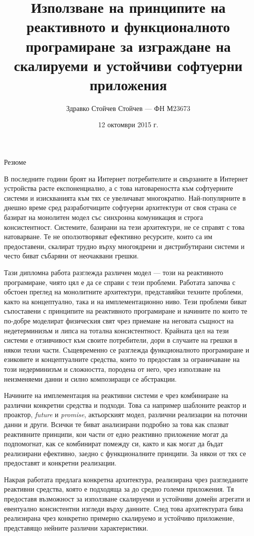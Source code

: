 \documentclass[a4paper, 12pt]{article}
\title{Използване на принципите на реактивното и функционалното програмиране за изграждане на скалируеми и устойчиви софтуерни приложения}
\author{Здравко Стойчев Стойчев — ФН М23673}
\date{12 октомври 2015 г.}
\begin{document}
  \maketitle
  
  \begin{center}
    \large Резюме
    \vspace{0.2em}
  \end{center}

  В последните години броят на Интернет потребителите и свързаните в Интернет устройства расте експоненциално, а с това натовареността към софтуерните системи и изискванията към тях се увеличават многократно. Най-популярните в днешно време сред разработчиците софтуерни архитектури от своя страна се базират на монолитен модел със синхронна комуникация и строга консистентност. Системите, базирани на тези архитектури, не се справят с това натоварване. Те не оползотворяват ефективно ресурсите, които са им предоставени, скалират трудно върху многоядрени и дистрибутирани системи и често биват събаряни от неочаквани грешки.
  
  Тази дипломна работа разглежда различен модел — този на реактивното програмиране, чиято цял е да се справи с тези проблеми. Работата започва с обстоен преглед на монолитните архитектури, представяйки техните проблеми, както на концептуално, така и на имплементационно ниво. Тези проблеми биват съпоставени с принципите на реактивното програмиране и начините по които те по-добре моделират физическия свят чрез приемане на неговата същност на недетерминизъм и липса на тотална консистентност. Крайната цел на тези системи е отзивчивост към своите потребители, дори в случаите на грешки в някои техни части. Същевременно се разглежда функционалното програмиране и езиковите и концептуалните средства, които то предоставя за ограничаване на този недерминизъм и сложността, породена от него, чрез използване на неизменяеми данни и силно композиращи се абстракции.
  
  Начините на имплементация на реактивни системи е чрез комбиниране на различни конкретни средства и подходи. Това са например шаблоните реактор и проактор, \textit{\textenglish{future}} и \textit{\textenglish{promise}}, актьорският модел, различни реализации на поточни данни и други. Всички те биват анализирани подробно за това как спазват реактивните принципи, кои части от едно реактивно приложение могат да подпомогнат, как се комбинират помежду си, както и как могат да бъдат реализирани ефективно, заедно с функционалните принципи. За някои от тях се предоставят и конкретни реализации.
  
  Накрая работата предлага конкретна архитектура, реализирана чрез разгледаните реактивни средства, която е подходяща за до средно големи приложения. Тя предоставя възможност за използване скалируеми и устойчиви домейн агрегати и евентуално консистентни изгледи върху данните. След това архитектурата бива реализирана чрез конкретно примерно скалируемо и устойчиво приложение, представящо нейните различни характеристики.
\end{document}
